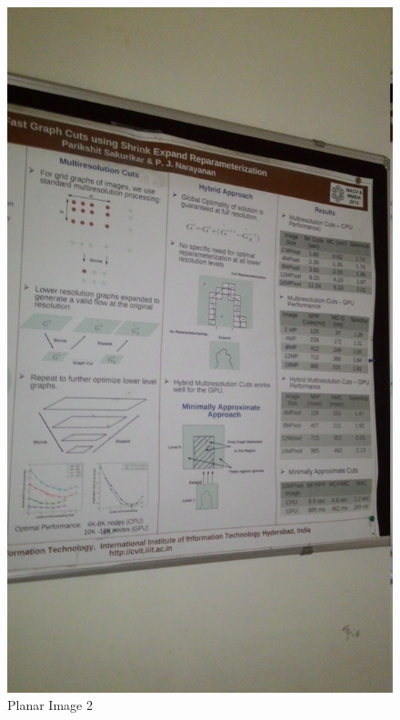 \documentclass[12pt]{article}
\begin{document}
\begin{figure}[h]
\begin{minipage}{0.7\textwidth}
\end{minipage}%
\begin{minipage}{.5\textwidth}
\centering
\includegraphics[scale = 0.07]{planar2.jpg}
\caption{Planar Image 2}
\label{fig:Image 2}
\end{minipage}%
\end{figure}
\end{document}
